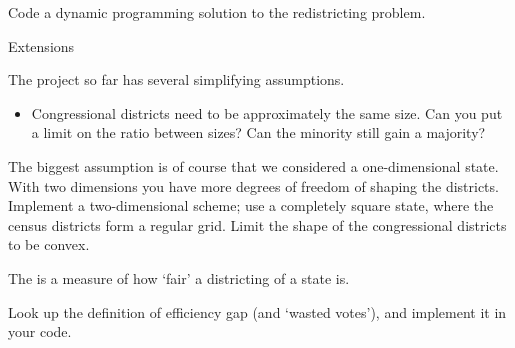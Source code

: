 \begin{comment}
\begin{itemize}
\item If you know the results for districting ten voters:
  \begin{itemize}
  \item you know the overall district majority, and
  \item you know the majority in the last district
  \end{itemize}
\item then for eleven voters you can
  \begin{itemize}
  \item add the new voter to the previous district, and compute the
    new majorities, overall and in the last district, or
  \item turn the new voter into a new district, and compute the two majorities.
  \end{itemize}
\item You need to compute the implications of adding the new voter,
  once for each possible districting of ten voters. 
\end{itemize}
\end{comment}

\begin{exercise}
  Code a dynamic programming solution to the redistricting problem. 
\end{exercise}

 {Extensions}

The project so far has several simplifying assumptions.
\begin{itemize}
\item Congressional districts need to be approximately the same
  size. Can you put a limit on the ratio between sizes? Can the
  minority still gain a majority?
\end{itemize}

\begin{exercise}
  The biggest assumption is of course that we considered a
  one-dimensional state. With two dimensions you have more degrees of
  freedom of shaping the districts. Implement a two-dimensional
  scheme; use a completely square state, where the census districts
  form a regular grid. Limit the shape of the congressional districts
  to be convex.
\end{exercise}

The  is a measure of how `fair' a
districting of a state is. 

\begin{exercise}
  Look up the definition of efficiency gap (and `wasted votes'), and
  implement it in your code.
\end{exercise}
